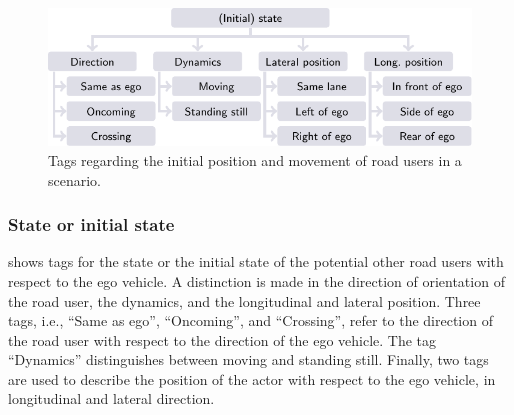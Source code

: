 \begin{figure}[t!]
	\centering
	\includegraphics{figures/initial_state}
	\caption{Tags regarding the initial position and movement of road users in a scenario.}
	\label{fig:tree initial state}
\end{figure}



\subsubsection{State or initial state}
\label{sec:initial state}

 shows tags for the state or the initial state of the potential other road users with respect to the ego vehicle. A distinction is made in the direction of orientation of the road user, the dynamics, and the longitudinal and lateral position. Three tags, i.e., ``Same as ego'', ``Oncoming'', and ``Crossing'', refer to the direction of the road user with respect to the direction of the ego vehicle. %
The tag ``Dynamics'' distinguishes between moving and standing still. 
Finally, two tags are used to describe the position of the actor with respect to the ego vehicle, in longitudinal and lateral direction. 

